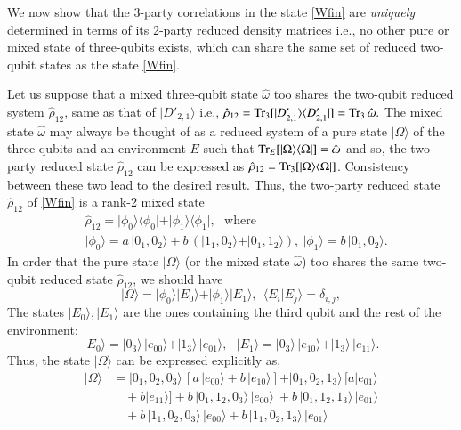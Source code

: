 We now show that the 3-party correlations in the state \eqref{Wfin} are  {\em uniquely} determined in terms of its 2-party reduced density matrices i.e., no other pure or mixed state of three-qubits exists, which can  share the same set of reduced two-qubit states as the state \eqref{Wfin}.

Let us suppose that a mixed  three-qubit state $\hat\omega$ too shares the  two-qubit reduced system $\hat{\rho}_{12}$, same as that of $\vert D'_{2,1}\rangle$ i.e., $\hat{\rho}_{12}={\rm Tr}_{3}[\vert D_{2,1}'\rangle\break\langle D_{2,1}'\vert]={\rm Tr}_{3}\,\hat{\omega}.$  The mixed state $\hat{\omega}$ may always be thought of as a reduced system of a pure state  $\vert\Omega\rangle$ of the three-qubits and an environment $E$ such that ${\rm Tr}_{E}[\vert\Omega\rangle\langle \Omega\vert]=\hat\omega$ and so, the two-party reduced state $\hat{\rho}_{12}$ can be expressed  as  $\hat{\rho}_{12}={\rm Tr}_{3}[\vert \Omega\rangle\langle \Omega\vert]$. Consistency between these two lead to the desired result. Thus, the two-party reduced  state $\hat{\rho}_{12}$ of \eqref{Wfin} is a rank-2 mixed state 
\begin{align}
&\hat{\rho}_{12}=\vert \phi_0\rangle\langle \phi_0\vert +\vert \phi_1\rangle\langle \phi_1\vert, \ \ \ \mbox{where}\label{wp2}\\ 
& \vert \phi_0\rangle= a\, \vert 0_1,0_2\rangle + b\, (\vert 1_1, 0_2\rangle +\vert 0_1,1_2\rangle),\  \vert \phi_1\rangle= b\, \vert 0_1,0_2\rangle. \nonumber
\end{align}
In order that the  pure state $\vert\Omega\rangle$ (or the mixed state $\hat\omega$) too shares the same two-qubit reduced state $\hat{\rho}_{12}$, we should have 
\begin{equation}
\vert\Omega\rangle=\vert \phi_0\rangle\vert E_0\rangle +\vert \phi_1\rangle\vert E_1\rangle, \ \  \langle E_i\vert E_j\rangle=\delta_{i,j},\label{wp3}
\end{equation}
The states $\vert E_{0}\rangle, \vert E_{1}\rangle$ are the ones containing the third qubit and the rest of the environment:    
$$
\vert E_0\rangle=\vert 0_3\rangle\,  \vert e_{00}\rangle+\vert 1_3\rangle\,  \vert e_{01}\rangle,\ \ \  \vert E_1\rangle=\vert 0_3\rangle\,  \vert e_{10}\rangle+\vert 1_3\rangle\,  \vert e_{11}\rangle. 
$$
Thus, the state $\vert \Omega\rangle$ can be expressed explicitly as,
\begin{align}
\vert \Omega\rangle&= \vert 0_1,0_2,0_3\rangle\, [a\,\vert e_{00}\rangle+b\, \vert e_{10}\rangle] + \vert 0_1,0_2,1_3\rangle\, [a\vert e_{01}\rangle\nonumber \\
&\quad +b\vert e_{11}\rangle]+ b\,  \vert 0_1,1_2,0_3\rangle\,\vert e_{00}\rangle  \ +b\,  \vert 0_1,1_2,1_3\rangle\,\vert e_{01}\rangle\nonumber \\ 
&\quad + b\,  \vert 1_1,0_2,0_3\rangle\,\vert e_{00}\rangle + b\,  \vert 1_1,0_2,1_3\rangle\,\vert e_{01}\rangle\label{omega}
\end{align}
